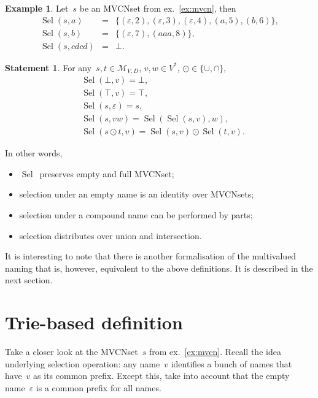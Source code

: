\documentclass{article}
\theoremstyle{definition}
\newtheorem{St}{Statement}
\newtheorem{Ex}{Example}
\newcommand{\setcharmvcn}{M}
\newcommand{\setsymbol}[3]{\mathcal{#1}_{#2,#3}}
\newcommand{\setmvcn}[2]{\setsymbol{\setcharmvcn}{#1}{#2}}
\newcommand{\select}{\operatorname{Sel}}
\begin{document}
\begin{Ex}\label{ex:mvcn-select}
Let~$s$ be an MVCNset from ex.~\ref{ex:mvcn}, then
\begin{eqnarray*}
  \select(s, a) & = & \{
    (\varepsilon, 2),
    (\varepsilon, 3),
    (\varepsilon, 4),
    (a,           5),
    (b,           6)
  \} , \\
  \select(s, b) & = & \{
    (\varepsilon, 7),
    (aaa,         8)
  \} , \\
  \select(s, cdcd) & = & \bot .
\end{eqnarray*}
\end{Ex}

\begin{St}\label{st:mvcn-selection-properties}
For any~$s,t\in\setmvcn{V}{D}$, $v, w\in V^\ast$, $\odot\in\{\cup, \cap\}$,
\begin{eqnarray*}
  & \select(\bot,v) = \bot, \\
  & \select(\top,v) = \top, \\
  & \select(s,\varepsilon) = s, \\
  & \select(s,vw) = \select(\select(s,v), w), \\
  & \select(s\odot t, v) = \select(s,v)\odot \select(t,v).
\end{eqnarray*}
\end{St}
In other words,
\begin{itemize}
\item $\select$~preserves empty and full MVCNset;
\item selection under an empty name is an identity over MVCNsets;
\item selection under a compound name can be performed by parts;
\item selection distributes over union and intersection.
\end{itemize}

It is interesting to note that there is another formalisation of the
multivalued naming that is, however, equivalent to the above definitions.  It
is described in the next section.



\section{Trie-based definition}

Take a closer look at the MVCNset~$s$ from ex.~\ref{ex:mvcn}.
Recall the
idea underlying selection operation: any name~$v$ identifies a bunch of
names that have~$v$ as its common prefix. Except this, take into account that
the empty name~$\varepsilon$ is a common prefix for all names.
\end{document}
